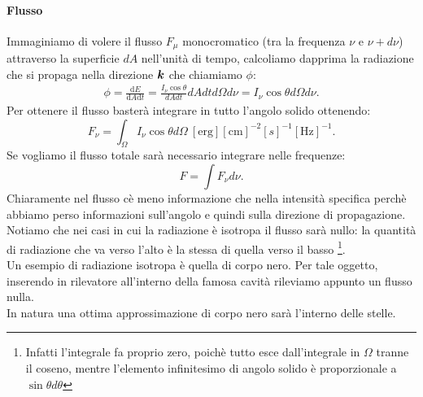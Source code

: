 \paragraph{Flusso}%
Immaginiamo di volere il flusso  $F_{\mu}$ monocromatico (tra la frequenza $\nu$ e $\nu + d\nu$) attraverso la superficie $dA$ nell'unità di tempo, calcoliamo dapprima la radiazione che si propaga nella direzione $\boldsymbol{k}$ che chiamiamo $\phi$:
\begin{align*}
	\phi = \frac{\mbox{d} E}{\mbox{d} A \text{d}t} = \frac{I_{\nu}\cos\theta}{dA dt} dA dt d\Omega d\nu = I_{\nu} \cos\theta d\Omega d\nu
.\end{align*}
Per ottenere il flusso basterà integrare in tutto l'angolo solido ottenendo:
\[
	F_{\nu} = \int_{\Omega} I_{\nu}\cos\theta d\Omega \ \left[ \text{erg} \right]  \left[ \text{cm} \right]^{-2} \left[ s \right]^{-1} \left[ \text{Hz} \right]^{-1} 
.\] 
Se vogliamo il flusso totale sarà necessario integrare nelle frequenze:
\[
	F = \int F_{\nu} d\nu
.\] 
Chiaramente nel flusso cè meno informazione che nella intensità specifica perchè abbiamo perso informazioni sull'angolo e quindi sulla direzione di propagazione.\\
Notiamo che nei casi in cui la radiazione è isotropa il flusso sarà nullo: la quantità di radiazione che va verso l'alto è la stessa di quella verso il basso \footnote{Infatti l'integrale fa proprio zero, poichè tutto esce dall'integrale in $\Omega$ tranne il coseno, mentre l'elemento infinitesimo di angolo solido è proporzionale a $\sin\theta d\theta$}.\\
Un esempio di radiazione isotropa è quella di corpo nero. Per tale oggetto, inserendo in rilevatore all'interno della famosa cavità rileviamo appunto un flusso nulla.\\
In natura una ottima approssimazione di corpo nero sarà l'interno delle stelle.\\
